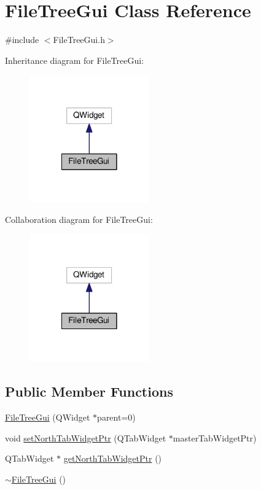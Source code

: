\hypertarget{class_file_tree_gui}{\section{File\-Tree\-Gui Class Reference}
\label{class_file_tree_gui}
}


{\ttfamily \#include $<$File\-Tree\-Gui.\-h$>$}



Inheritance diagram for File\-Tree\-Gui\-:\nopagebreak
\begin{figure}[H]
\begin{center}
\leavevmode
\includegraphics[width=146pt]{class_file_tree_gui__inherit__graph}
\end{center}
\end{figure}


Collaboration diagram for File\-Tree\-Gui\-:\nopagebreak
\begin{figure}[H]
\begin{center}
\leavevmode
\includegraphics[width=146pt]{class_file_tree_gui__coll__graph}
\end{center}
\end{figure}
\subsection*{Public Member Functions}
\begin{DoxyCompactItemize}
\item 
\hyperlink{class_file_tree_gui_acf857f2793adefb176a680d541c24691}{File\-Tree\-Gui} (Q\-Widget $\ast$parent=0)
\item 
void \hyperlink{class_file_tree_gui_a18f7e0f7c76bb92cf164be6005786871}{set\-North\-Tab\-Widget\-Ptr} (Q\-Tab\-Widget $\ast$master\-Tab\-Widget\-Ptr)
\item 
Q\-Tab\-Widget $\ast$ \hyperlink{class_file_tree_gui_a73a0e330ec676df9e822a612b6e2f08e}{get\-North\-Tab\-Widget\-Ptr} ()
\item 
\hyperlink{class_file_tree_gui_a11cc4baa3a62a625e95155c27a0d7258}{$\sim$\-File\-Tree\-Gui} ()
\end{DoxyCompactItemize}
